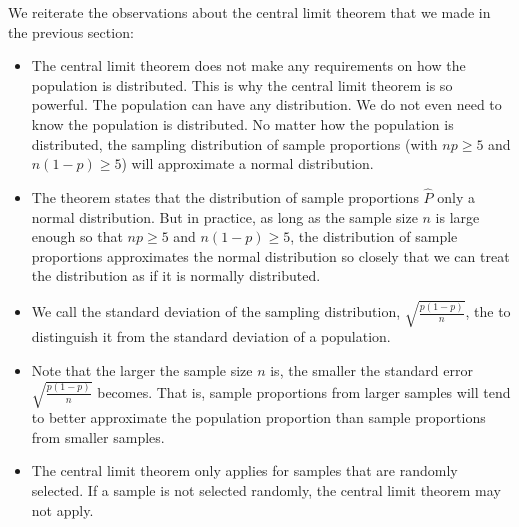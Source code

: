 \documentclass[letterpaper,10pt,english]{jupyterBook}
\begin{document}
\sphinxAtStartPar
We reiterate the observations about the central limit theorem that we made in the previous section:
\begin{itemize}
\item {} 
\sphinxAtStartPar
The central limit theorem does not make any requirements on how the population is distributed. This is why the central limit theorem is so powerful. The population can have any distribution. We do not even need to know  the population is distributed. No matter how the population is distributed, the sampling distribution of sample proportions (with \(np \geq 5\) and \(n(1-p) \geq 5\)) will approximate a normal distribution.

\item {} 
\sphinxAtStartPar
The theorem states that the distribution of sample proportions \(\hat{P}\) only  a normal distribution. But in practice, as long as the sample size \(n\) is large enough so that \(np \geq 5\) and \(n(1-p) \geq 5\), the distribution of sample proportions approximates the normal distribution so closely that we can treat the distribution as if it is normally distributed.

\item {} 
\sphinxAtStartPar
We call the standard deviation of the sampling distribution, \(\sqrt{\frac{p(1-p)}{n}}\), the  to distinguish it from the standard deviation of a population.

\item {} 
\sphinxAtStartPar
Note that the larger the sample size \(n\) is, the smaller the standard error \(\sqrt{\frac{p(1-p)}{n}}\) becomes. That is, sample proportions from larger samples will tend to better approximate the population proportion than sample proportions from smaller samples.

\item {} 
\sphinxAtStartPar
The central limit theorem only applies for samples that are randomly selected. If a sample is not selected randomly, the central limit theorem may not apply.

\end{itemize}
\end{document}

